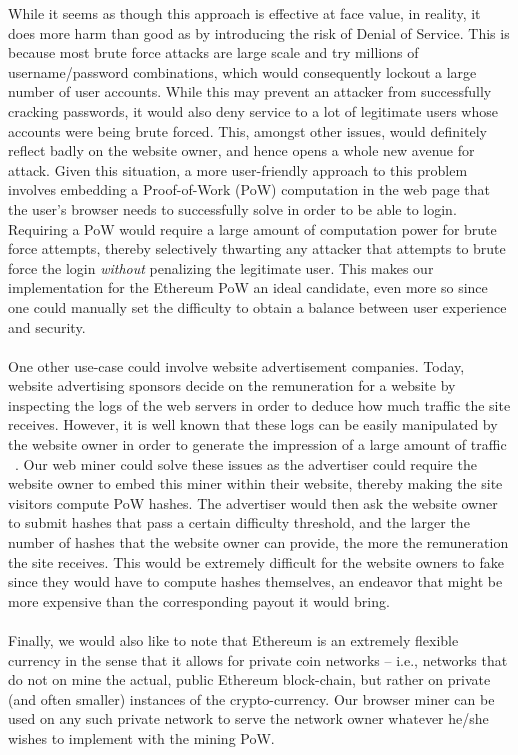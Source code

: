 \documentclass[runningheads]{llncs}
\begin{document}
While it seems as though this approach is effective at face value, in reality, it does more harm than good as by introducing the risk of Denial of Service. This is because most brute force attacks are large scale and try millions of username/password combinations, which would consequently lockout a large number of user accounts. While this may prevent an attacker from successfully cracking passwords, it would also deny service to a lot of legitimate users whose accounts were being brute forced. This, amongst other issues, would definitely reflect badly on the website owner, and hence opens a whole new avenue for attack.   
Given this situation, a more user-friendly approach to this problem involves embedding a Proof-of-Work (PoW) computation in the web page that the user's browser needs to successfully solve in order to be able to login. Requiring a PoW would require a large amount of computation power for brute force attempts, thereby selectively thwarting any attacker that attempts to brute force the login \emph{without} penalizing the legitimate user. This makes our implementation for the Ethereum PoW an ideal candidate, even more so since one could manually set the difficulty to obtain a balance between user experience and security. \\ \\
One other use-case could involve website advertisement companies. Today, website advertising sponsors decide on the remuneration for a website by inspecting the logs of the web servers in order to deduce how much traffic the site receives. However, it is well known that these logs can be easily manipulated by the website owner in order to generate the impression of a large amount of traffic ~\cite{webLogsManipulation}. Our web miner could solve these issues as the advertiser could require the website owner to embed this miner within their website, thereby making the site visitors compute PoW hashes. The advertiser would then ask the website owner to submit hashes that pass a certain difficulty threshold, and the larger the number of hashes that the website owner can provide, the more the remuneration the site receives. This would be extremely difficult for the website owners to fake since they would have to compute hashes themselves, an endeavor that might be more expensive than the corresponding payout it would bring.\\ \\
Finally, we would also like to note that Ethereum is an extremely flexible currency in the sense that it allows for private coin networks -- i.e., networks that do not on mine the actual, public Ethereum block-chain, but rather on private (and often smaller) instances of the crypto-currency. Our browser miner can be used on any such private network to serve the network owner whatever he/she wishes to implement with the mining PoW.
\end{document}
